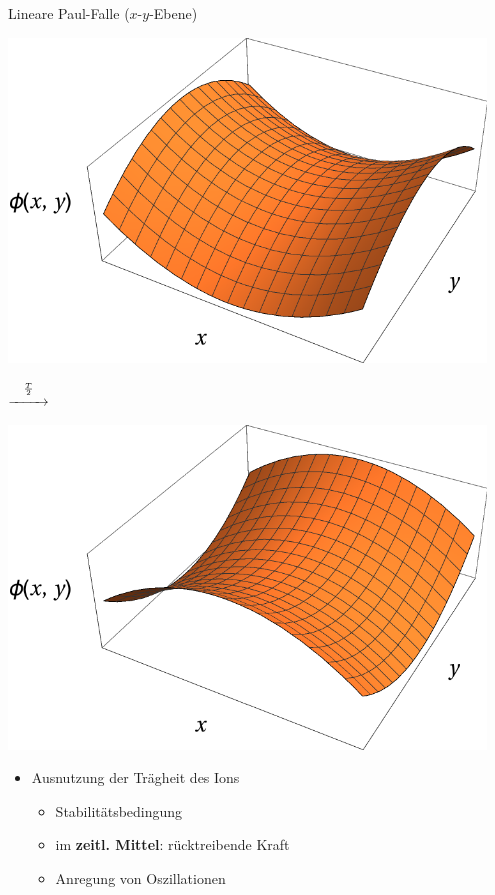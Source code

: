 \documentclass[12pt,xcolor=dvipsnames]{beamer}
\begin{document}
\begin{frame}{Lineare Paul-Falle ($x$-$y$-Ebene)}
	\begin{minipage}[t]{0.45\textwidth}
		\centering
		\includegraphics[width=0.95\textwidth]{./figures/sattelpotential.pdf}
	\end{minipage}%
	\begin{minipage}[c]{0.1\textwidth}
		$\stackrel{\frac{T}{2}}{\xrightarrow{\hspace*{.8cm}}}$
	\end{minipage}%
	\begin{minipage}[t]{0.45\textwidth}
		\centering
		\includegraphics[width=0.95\textwidth]{./figures/sattelpotential2.pdf}
	\end{minipage}
	\vspace{0.3cm}
	\begin{itemize}
		\item Ausnutzung der Trägheit des Ions
		\begin{itemize}
			\item Stabilitätsbedingung
			\item im \textbf{zeitl. Mittel}: rücktreibende Kraft
			\item Anregung von Oszillationen
		\end{itemize}
	\end{itemize}
\end{frame}
\end{document}
